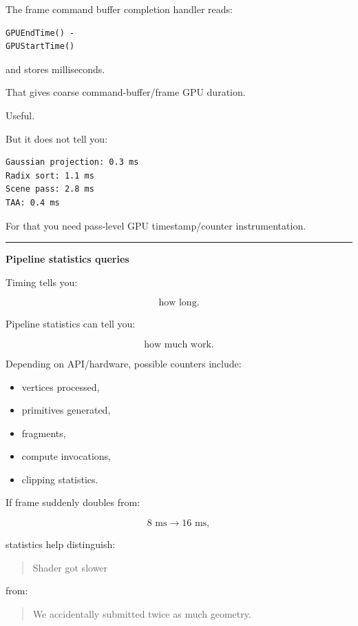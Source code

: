 The frame command buffer completion handler reads:

\protect{}\label{p10-gpu-time}%
\begin{verbatim}
GPUEndTime() -
GPUStartTime()
\end{verbatim}

and stores milliseconds.

That gives coarse command-buffer/frame GPU duration.

Useful.

But it does not tell you:

\protect{}\label{p10-pass-timing-needed}%
\begin{verbatim}
Gaussian projection: 0.3 ms
Radix sort: 1.1 ms
Scene pass: 2.8 ms
TAA: 0.4 ms
\end{verbatim}

For that you need pass-level GPU timestamp/counter instrumentation.

\begin{center}\rule{0.5\linewidth}{0.5pt}\end{center}

\textbf{Pipeline statistics queries}

Timing tells you:

\[
\text{how long}.
\]

Pipeline statistics can tell you:

\[
\text{how much work}.
\]

Depending on API/hardware, possible counters include:

\begin{itemize}
\tightlist
\item
  vertices processed,
\item
  primitives generated,
\item
  fragments,
\item
  compute invocations,
\item
  clipping statistics.
\end{itemize}

If frame suddenly doubles from:

\[
8\text{ ms}\rightarrow16\text{ ms},
\]

statistics help distinguish:

\begin{quote}
Shader got slower
\end{quote}

from:

\begin{quote}
We accidentally submitted twice as much geometry.
\end{quote}

